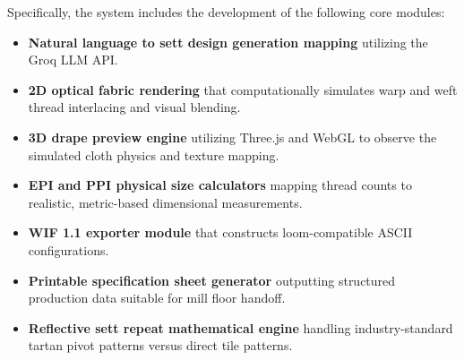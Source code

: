Specifically, the system includes the development of the following core modules:
\begin{itemize}
    \item \textbf{Natural language to sett design generation mapping} utilizing the Groq LLM API.
    \item \textbf{2D optical fabric rendering} that computationally simulates warp and weft thread interlacing and visual blending.
    \item \textbf{3D drape preview engine} utilizing Three.js and WebGL to observe the simulated cloth physics and texture mapping.
    \item \textbf{EPI and PPI physical size calculators} mapping thread counts to realistic, metric-based dimensional measurements.
    \item \textbf{WIF 1.1 exporter module} that constructs loom-compatible ASCII configurations.
    \item \textbf{Printable specification sheet generator} outputting structured production data suitable for mill floor handoff.
    \item \textbf{Reflective sett repeat mathematical engine} handling industry-standard tartan pivot patterns versus direct tile patterns.
\end{itemize}


